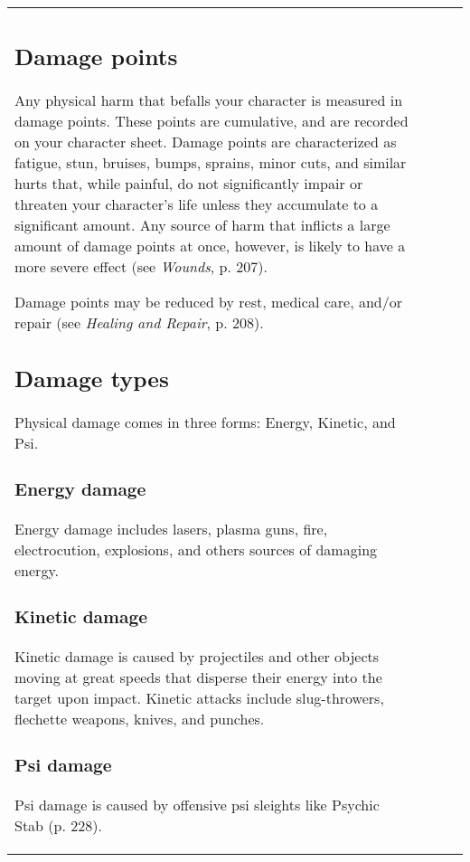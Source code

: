 \begin{table}
\begin{tabular}{|p{8cm}|r|r|r|}
\subsection{Damage points} \label{sec:damage-points} 

Any physical harm that befalls your character is measured in damage points. These points are cumulative, and are recorded on your character sheet. Damage points are characterized as fatigue, stun, bruises, bumps, sprains, minor cuts, and similar hurts that, while painful, do not significantly impair or threaten your character’s life unless they accumulate to a significant amount. Any source of harm that inflicts a large amount of damage points at once, however, is likely to have a more severe effect (see \emph{Wounds}, p. 207). 

Damage points may be reduced by rest, medical care, and/or repair (see \emph{Healing and Repair}, p. 208). 



\subsection{Damage types} \label{sec:damage-types} 

Physical damage comes in three forms: Energy, Kinetic, and Psi. 

\subsubsection{Energy damage} 

Energy damage includes lasers, plasma guns, fire, electrocution, explosions, and others sources of damaging energy. 

\subsubsection{Kinetic damage} 

Kinetic damage is caused by projectiles and other objects moving at great speeds that disperse their energy into the target upon impact. Kinetic attacks include slug-throwers, flechette weapons, knives, and punches. 

\subsubsection{Psi damage} 

Psi damage is caused by offensive psi sleights like Psychic Stab (p. 228). 




\end{tabular}
\end{table}
